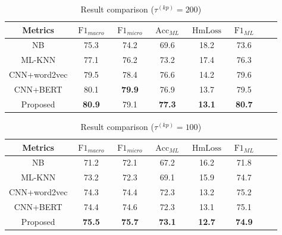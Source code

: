 \begin{table}[H]
	\caption{Result comparison (\(\tau^{(kp)}=200 \))}\label{tbl:bsline1}
	\centering
	\begin{tabular}{cccccccc}
		\toprule
		Metrics      & \(\operatorname{F1}_{macro}\) & \(\operatorname{F1}_{micro}\) & \(\operatorname{Acc}_{ML}\) & \(\operatorname{HmLoss}\) & \(\operatorname{F1}_{ML}\) \\
		\midrule
		NB           & 75.3                          & 74.2                          & 69.6                        & 18.2                      & 73.6                       \\
		ML-KNN       & 77.1                          & 76.2                          & 73.2                        & 17.4                      & 76.3                       \\
		CNN+word2vec & 79.5                          & 78.4                          & 76.6                        & 14.2                      & 79.6                       \\
		CNN+BERT     & 80.1                          & \textbf{79.9}                 & 76.9                        & 13.7                      & 79.5                       \\
		Proposed     & \textbf{80.9}                 & 79.1                          & \textbf{77.3}               & \textbf{13.1}             & \textbf{80.7}              \\
		\bottomrule
	\end{tabular}
\end{table}


\begin{table}
	\centering
	\caption{Result comparison (\(\tau^{(kp)}=100 \))}\label{tbl:bsline2}
	\begin{tabular}{cccccccc}
		\toprule
		Metrics      & \(\operatorname{F1}_{macro}\) & \(\operatorname{F1}_{micro}\) & \(\operatorname{Acc}_{ML}\) & \(\operatorname{HmLoss}\) & \(\operatorname{F1}_{ML}\) \\
		\midrule
		NB           & 71.2                          & 72.1                          & 67.2                        & 16.2                      & 71.8                       \\
		ML-KNN       & 73.2                          & 72.3                          & 69.1                        & 15.9                      & 74.7                       \\
		CNN+word2vec & 74.3                          & 74.4                          & 72.3                        & 13.2                      & 75.2                       \\
		CNN+BERT     & 74.4                          & 74.6                          & 72.3                        & 13.1                      & 75.1                       \\
		Proposed     & \textbf{75.5}                 & \textbf{75.7}                 & \textbf{73.1}               & \textbf{12.7}             & \textbf{74.9}              \\
		\bottomrule
	\end{tabular}
\end{table}

